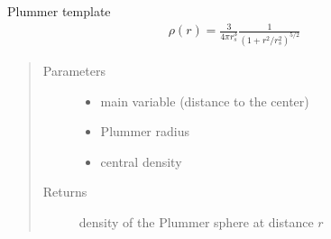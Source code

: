 \documentclass[letterpaper,10pt,english]{sphinxmanual}
\begin{document}
\begin{fulllineitems}
\label{\detokenize{diffsph.profiles:diffsph.profiles.templates.plmm}}
\sphinxAtStartPar
Plummer template
\begin{equation*}
\begin{split}\rho(r) = \frac3{4\pi r_s^3}\frac1{(1+r^2/r_s^2)^{5/2}}\end{split}
\end{equation*}\begin{quote}\begin{description}
\item[{Parameters}] \leavevmode\begin{itemize}
\item {} 
\sphinxAtStartPar
{} \textendash{} main variable (distance to the center)

\item {} 
\sphinxAtStartPar
{} \textendash{} Plummer radius

\item {} 
\sphinxAtStartPar
{} \textendash{} central density

\end{itemize}

\item[{Returns}] \leavevmode
\sphinxAtStartPar
density of the Plummer sphere at distance \(r\)

\end{description}\end{quote}

\end{fulllineitems}

\end{document}
